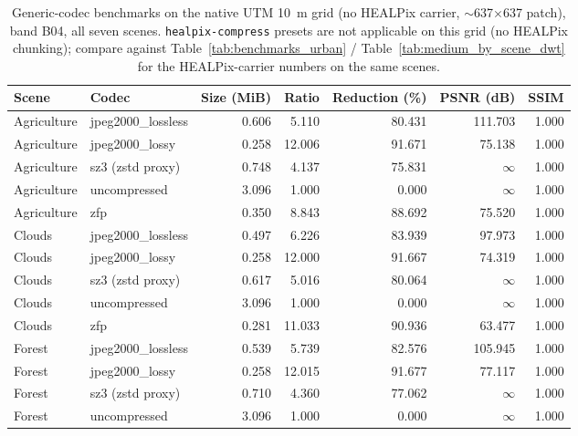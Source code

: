 \begin{table}[t]
\centering
\caption{Generic-codec benchmarks on the native UTM \SI{10}{m} grid (no HEALPix carrier, $\sim$637$\times$637 patch), band B04, all seven scenes. \texttt{healpix-compress} presets are not applicable on this grid (no HEALPix chunking); compare against Table~\ref{tab:benchmarks_urban} / Table~\ref{tab:medium_by_scene_dwt} for the HEALPix-carrier numbers on the same scenes.}
\label{tab:utm_native_codecs}
\begin{tabular}{@{}llrrrrr@{}}
\toprule
Scene & Codec & Size (MiB) & Ratio & Reduction (\%) & PSNR (dB) & SSIM \\
\midrule
Agriculture & jpeg2000\_lossless & 0.606 & 5.110  & 80.431 & 111.703  & 1.000 \\
Agriculture & jpeg2000\_lossy    & 0.258 & 12.006 & 91.671 & 75.138   & 1.000 \\
Agriculture & sz3 (zstd proxy)   & 0.748 & 4.137  & 75.831 & $\infty$ & 1.000 \\
Agriculture & uncompressed       & 3.096 & 1.000  & 0.000  & $\infty$ & 1.000 \\
Agriculture & zfp                & 0.350 & 8.843  & 88.692 & 75.520   & 1.000 \\
Clouds      & jpeg2000\_lossless & 0.497 & 6.226  & 83.939 & 97.973   & 1.000 \\
Clouds      & jpeg2000\_lossy    & 0.258 & 12.000 & 91.667 & 74.319   & 1.000 \\
Clouds      & sz3 (zstd proxy)   & 0.617 & 5.016  & 80.064 & $\infty$ & 1.000 \\
Clouds      & uncompressed       & 3.096 & 1.000  & 0.000  & $\infty$ & 1.000 \\
Clouds      & zfp                & 0.281 & 11.033 & 90.936 & 63.477   & 1.000 \\
Forest      & jpeg2000\_lossless & 0.539 & 5.739  & 82.576 & 105.945  & 1.000 \\
Forest      & jpeg2000\_lossy    & 0.258 & 12.015 & 91.677 & 77.117   & 1.000 \\
Forest      & sz3 (zstd proxy)   & 0.710 & 4.360  & 77.062 & $\infty$ & 1.000 \\
Forest      & uncompressed       & 3.096 & 1.000  & 0.000  & $\infty$ & 1.000 \\

\end{tabular}
\end{table}
